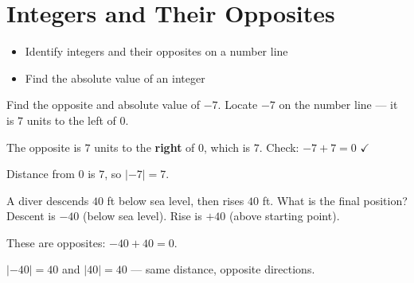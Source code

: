\section{Integers and Their Opposites}

\begin{stepGoal}
\begin{itemize}
    \item Identify integers and their opposites on a number line
    \item Find the absolute value of an integer
\end{itemize}
\end{stepGoal}

\begin{stepVocabBox}
\end{stepVocabBox}

\begin{stepsCard}
\end{stepsCard}

\begin{stepExample}{Find the opposite and absolute value of $-7$.}
     Locate $-7$ on the number line — it is $7$ units to the left of $0$.

     The opposite is $7$ units to the \textbf{right} of $0$, which is $7$.
    Check: $-7 + 7 = 0$ $\checkmark$

     Distance from $0$ is $7$, so $|-7| = 7$.
\end{stepExample}

\begin{stepExample}{A diver descends $40$ ft below sea level, then rises $40$ ft. What is the final position?}
     Descent is $-40$ (below sea level). Rise is $+40$ (above starting point).

     These are opposites: $-40 + 40 = 0$.

     $|-40| = 40$ and $|40| = 40$ — same distance, opposite directions.
\end{stepExample}


